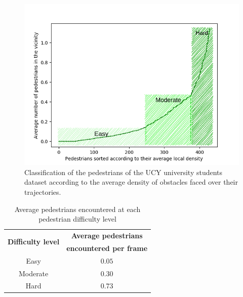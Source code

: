 \begin{itemize}
        \begin{figure}
        	\centering
        	\includegraphics[width=0.8\linewidth]{plots/ucy_students_density_divisions.png}
        	\caption{Classification of the pedestrians of the UCY university students dataset according to the average density of obstacles faced over their trajectories.}
        	\label{fig:ucy_ped_density_division}
        \end{figure}
		\begin{table}[!htbp]
			\begin{center}
			\renewcommand{\arraystretch}{1.3}
				\begin{tabular}{|c|c|}
					\hline
					\multirow{2}{*}{\textbf{Difficulty level}} & \textbf{Average pedestrians} \\
										& \textbf{encountered per frame} \\
				    \hline
					Easy & $0.05$ \\
					Moderate & $0.30$ \\
					Hard & $0.73$\\
				   \hline
				\end{tabular}
			\caption{Average pedestrians encountered at each pedestrian difficulty level}
			\label{tab:ucy_difficulty_level_division}
			\end{center}
		\end{table}
\end{itemize}

